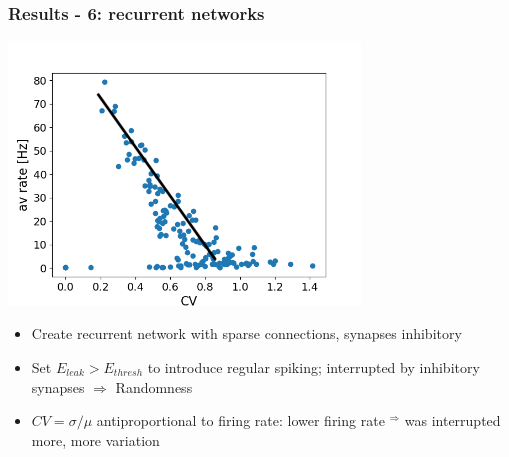 \documentclass{beamer}
\begin{document}
\begin{frame}
	\frametitle{Results - 6: recurrent networks}
	\centering
	\includegraphics[width=0.7\textwidth]{figures/rate_CV.png}


	\begin{itemize}
		\item Create recurrent network with sparse connections, synapses inhibitory
		\item Set $E_{leak} > E_{thresh}$ to introduce regular spiking; interrupted
		by inhibitory synapses $\Rightarrow$ Randomness
		\item $CV = \sigma / \mu$ antiproportional to firing rate: lower firing rate 
		$^\Rightarrow$ was interrupted more,  more variation
	\end{itemize}

\end{frame}
\end{document}
